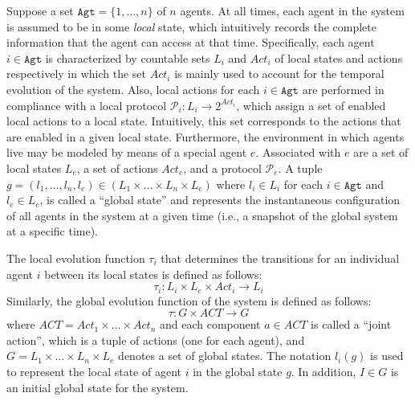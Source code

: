 Suppose a set $\texttt{Agt}=\{1,\ldots,n\}$ of $n$
agents. At all times, each agent in the system is assumed to be in
some \textit{local} state, which intuitively records the complete
information that the agent can access at that time. Specifically,
each agent $i\in \texttt{Agt}$ is characterized by countable sets
$L_i$ and $Act_i$ of local states and actions respectively in
which the set $Act_i$ is mainly used to account for the temporal
evolution of the system. Also, local actions for each $i\in
\texttt{Agt}$ are performed in compliance with a local protocol
$\mathcal{P}_i: L_i\rightarrow 2^{Act_i}$, which assign a set
of enabled local actions to a local state. Intuitively, this set corresponds to the actions that are enabled in a given local state. Furthermore, the environment in which agents live may be modeled by means of a special agent $e$. Associated with $e$ are a set of local states
$L_e$, a set of actions $Act_e$, and a protocol $\mathcal{P}_e$. A
tuple $g = (l_1,\ldots, l_n,l_e) \in (L_1\times \ldots \times
L_n\times L_e)$ where $l_i\in L_i$ for each $i\in \texttt{Agt}$
and $l_e\in L_e$, is called a ``global state'' and represents the
instantaneous configuration of all agents in the system at a given
time (i.e., a snapshot of the global system at a specific time).

The local evolution function $\tau_i$ that determines the
transitions for an individual agent $i$ between its local states
is defined as follows:
%
\begin{equation}
\tau_i : L_i\times L_e\times Act_i \rightarrow L_i
\end{equation}
%
Similarly, the global evolution function of the system is defined as follows:
%
\begin{equation}
\tau : G\times ACT\rightarrow G
\end{equation}
%
where $ACT=Act_1 \times \ldots \times Act_n$ and each component
$a\in ACT$ is called a ``joint action'', which is a tuple of
actions (one for each agent), and $G = L_1\times \ldots\times
L_n\times L_e$ denotes a set of global states. The notation
$l_i(g)$ is used to represent the local state of agent $i$ in the
global state $g$. In addition, $I\in G$ is an initial global state
for the system. %


